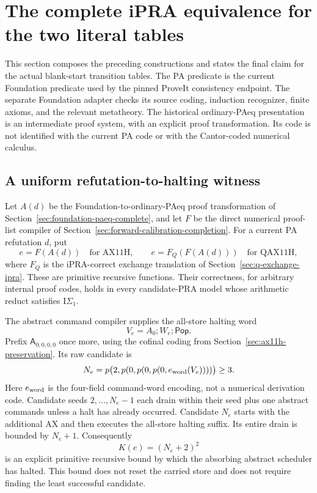 \section{The complete iPRA equivalence for the two literal tables}
\label{sec:complete-equivalence}

This section composes the preceding constructions and states the final
claim for the actual blank-start transition tables.  The PA predicate is
the current Foundation predicate used by the pinned ProveIt consistency
endpoint.  The separate Foundation adapter checks its source coding,
induction recognizer, finite axioms, and the relevant metatheory.  The
historical ordinary-PAeq presentation is an intermediate proof system,
with an explicit proof transformation.  Its code is not identified with
the current PA code or with the Cantor-coded numerical calculus.

\subsection{A uniform refutation-to-halting witness}

Let $A(d)$ be the Foundation-to-ordinary-PAeq proof transformation of
Section~\ref{sec:foundation-paeq-complete}, and let $F$ be the direct
numerical proof-list compiler of
Section~\ref{sec:forward-calibration-completion}.  For a current PA
refutation $d$, put
\[
 e=F(A(d))\quad\text{for AX11H},\qquad
 e=F_Q(F(A(d)))\quad\text{for QAX11H},
\]
where $F_Q$ is the iPRA-correct exchange translation of
Section~\ref{sec:q-exchange-ipra}.  These are primitive recursive
functions.  Their correctness, for arbitrary internal proof codes, holds
in every candidate-PRA model whose arithmetic reduct satisfies
$\mathrm I\Sigma_1$.

The abstract command compiler supplies the all-store halting word
\[
 V_e=A_0;W_e;\mathsf{Pop}.
\]
Prefix $\mathsf A_{0,0,0,0}$ once more, using the cofinal coding from
Section~\ref{sec:ax11h-preservation}.  Its raw candidate is
\[
 N_e=p\bigl(2,p(0,p(0,p(0,e_{\rm word}(V_e))))\bigr)\ge3.
\]
Here $e_{\rm word}$ is the four-field command-word encoding, not a
numerical derivation code.  Candidate seeds $2,\ldots,N_e-1$ each
drain within their seed plus one abstract commands unless a halt has
already occurred.  Candidate $N_e$ starts with the additional AX and
then executes the all-store halting suffix.  Its entire drain is bounded
by $N_e+1$.  Consequently
\[
 K(e)=(N_e+2)^2
\]
is an explicit primitive recursive bound by which the absorbing abstract
scheduler has halted.  This bound does not reset the carried store and
does not require finding the least successful candidate.

